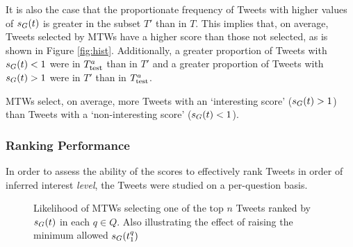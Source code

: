 It is also the case that the proportionate frequency of Tweets with higher values of $s_G(t)$ is greater in the subset $T'$ than in $T$. This implies that, on average, Tweets selected by MTWs have a higher score than those not selected, as is shown in Figure \ref{fig:hist}. Additionally, a greater proportion of Tweets with $s_G(t) < 1$ were in $T^a_{\textrm{test}}{}$ than in $T'$ and a greater proportion of Tweets with $s_G(t) > 1$ were in $T'$ than in $T^a_{\textrm{test}}{}$.

\begin{myobservation}
    MTWs select, on average, more Tweets with an `interesting score' ($s_G(t) > 1$) than Tweets with a `non-interesting score' ($s_G(t) < 1$).
\end{myobservation}


\subsubsection{Ranking Performance}

In order to assess the ability of the scores to effectively rank Tweets in order of inferred interest \textit{level}, the Tweets were studied on a per-question basis.

\begin{figure}[h]
\centering
{}
\caption{Likelihood of MTWs selecting one of the top $n$ Tweets ranked by $s_G(t)$ in each $q \in Q$. Also illustrating the effect of raising the minimum allowed $s_G(t^q_1)$}
\label{fig:score-dist}
\end{figure}

